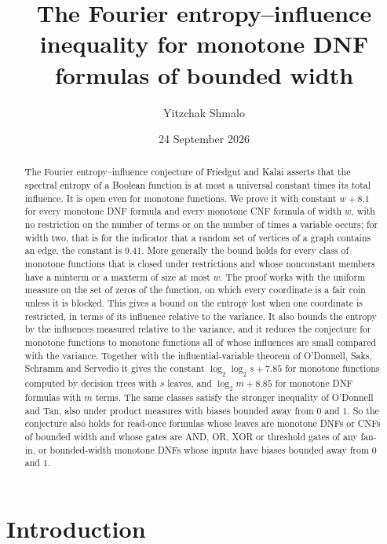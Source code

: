 \documentclass[11pt]{amsart}
\title[Entropy--influence for monotone DNFs of bounded width]{The Fourier entropy--influence inequality for monotone DNF formulas of bounded width}
\author{Yitzchak Shmalo}
\date{24 September 2026}
\theoremstyle{remark}
\begin{document}
\begin{abstract}
The Fourier entropy--influence conjecture of Friedgut and Kalai asserts that the spectral entropy of a Boolean
function is at most a universal constant times its total influence. It is open even for monotone functions. We prove
it with constant $w+8.1$ for every monotone DNF formula and every monotone CNF formula of width $w$, with no
restriction on the number of terms or on the number of times a variable occurs; for width two, that is for the
indicator that a random set of vertices of a graph contains an edge, the constant is $9.41$. More generally the
bound holds for every class of monotone functions that is closed under restrictions and whose nonconstant members
have a minterm or a maxterm of size at most $w$. The proof works with the uniform measure on the set of zeros of
the function, on which every coordinate is a fair coin unless it is blocked. This gives a bound on the entropy lost
when one coordinate is restricted, in terms of its influence relative to the variance. It also bounds the entropy by
the influences measured relative to the variance, and it reduces the conjecture for monotone functions to monotone
functions all of whose influences are small compared with the variance. Together with the influential-variable theorem of
O'Donnell, Saks, Schramm and Servedio it gives the constant $\log_2\log_2s+7.85$ for monotone functions computed by
decision trees with $s$ leaves, and $\log_2m+8.85$ for monotone DNF formulas with $m$ terms. The same classes satisfy the stronger inequality of
O'Donnell and Tan, also under product measures with biases bounded away from $0$ and $1$. So the conjecture also holds
for read-once formulas whose leaves are monotone DNFs or CNFs of bounded width and whose gates are AND, OR, XOR or
threshold gates of any fan-in, or bounded-width monotone DNFs whose inputs have biases bounded away from $0$ and $1$.
\end{abstract}

\maketitle

\section{Introduction}
\end{document}
